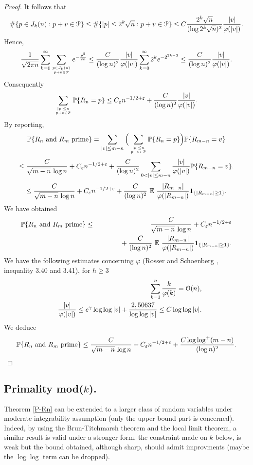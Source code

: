 \documentclass[11pt,draft,reqno]{amsart}
\theoremstyle{definition}
\theoremstyle{remarks}
\numberwithin{equation}{section}
\def \e{{\varepsilon}}
\def \p{{\varphi}}
\def \qq{{\qquad}}
\def\P{{\mathcal P}}
\def\E{{\mathbb E \,}}
\def\P{{\mathbb P}}
\begin{document}
\begin{proof}
It follows that  $$\#\{ p\in J_k(n) : p+v\in {\mathcal P} \}\le \#\{ |p|\le 2^k\sqrt n : p+v\in {\mathcal P} \}\le C{ 2^k\sqrt n\over (\log 2^k\sqrt n)^2}
{|v|\over \p(|v|)}. $$ 
Hence,
$${1\over  \sqrt{ 2\pi n}} \sum_{k=0}^\infty \sum_{p\in J_k(n)\atop
p+v\in {\mathcal P}} e^{-  {p^2\over  2 n } }\le {C\over (\log n)^2}{|v|\over \p(|v|)} \sum_{k=0}^\infty 2^k e^{-2^{2k-3}}\le {C\over (\log
n)^2}{|v|\over \p(|v|)}.$$
 Consequently
$$\sum_{|p|\le  n\atop
p+v\in {\mathcal P}} \P\{R_n=p \}\le C_\e n^{-1/2+\e} + {C\over (\log
n)^2}{|v|\over \p(|v|)}.$$
By reporting,
$$\P\{R_n\ {\rm and} \ R_m\hbox{ prime} \}  =\sum_{|v|\le m-n}\Big(\sum_{|p|\le  n\atop
p+v\in {\mathcal P}}\P\{R_n=p \}\Big)\P\{R_{m-n}=v \} $$
$$ \le {C\over \sqrt{ m-n } \,\log n} +C_\e n^{-1/2+\e} + {C\over (\log
n)^2}\sum_{0<|v|\le m-n} {|v|\over \p(|v|)}\P\{R_{m-n}=v \} .$$
$$ \le {C\over \sqrt{ m-n } \,\log n} +C_\e n^{-1/2+\e} + {C\over (\log
n)^2}\ \E \, {|R_{m-n}|\over \p(|R_{m-n}|)} {\bf 1}_{\{|R_{m-n}|\ge 1\}} .$$
We have obtained 
\begin{eqnarray*}\P\{R_n\ {\rm and} \ R_m\hbox{ prime} \}&\le & {C\over \sqrt{ m-n } \,\log n} +C_\e n^{-1/2+\e} 
\cr & &\qq \quad + {C\over (\log
n)^2}\ \E \, {|R_{m-n}|\over \p(|R_{m-n}|)} {\bf 1}_{\{|R_{m-n}|\ge 1\}}.
\end{eqnarray*}
We have the following estimates concerning $\p$ (Rosser and Schoenberg \cite{RS},  inequality 3.40 and 3.41), for $h\ge 3$
\begin{eqnarray*}&& \sum_{k=1}^n {k\over \p(k)}={\mathcal O}(n)  ,
\cr & & {|v|\over \p(|v|)}\le e^\gamma \log\log |v| + {2,50637\over \log\log |v|}\le C\log\log |v|.
 \end{eqnarray*}
We deduce
$$\P\{R_n\ {\rm and} \ R_m\hbox{ prime} \}\le  {C\over \sqrt{ m-n } \,\log n} +C_\e n^{-1/2+\e} + {C \log\log^+    (m-n  )\over (\log
n)^2}     .$$
\end{proof}










  



\bigskip\par
 
\subsection{Primality mod($k$).}

Theorem \ref{P-Rn} can be extended to a   larger class of random variables under moderate integrability assumption (only the upper bound part is concerned).  Indeed, by using the Brun-Titchmarsh  theorem and the local limit theorem, a similar result is valid under a stronger form,   the constraint made on $k$ below, is weak but the bound obtained, although sharp, should admit  improvments (maybe the $\log\log$ term can be dropped).
\end{document}
